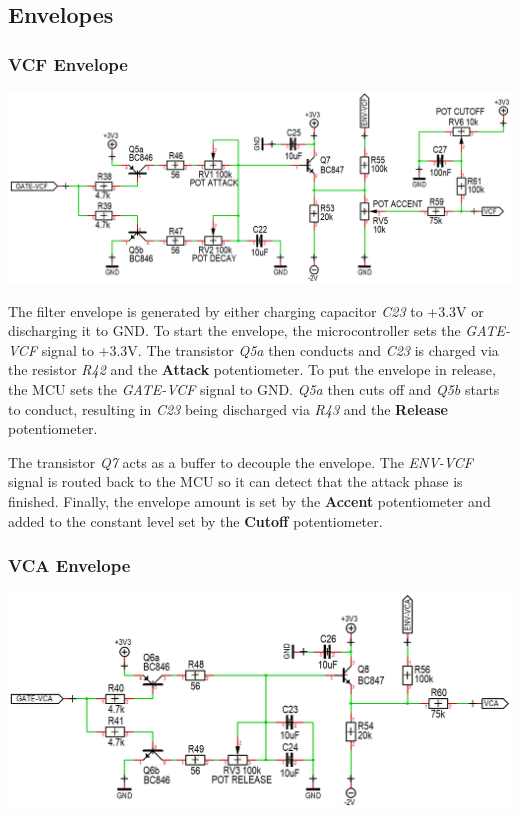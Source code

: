 \documentclass{scrartcl}
\begin{document}
\subsection{Envelopes}

\subsubsection{VCF Envelope}

\begin{center}
    \includegraphics[scale=0.35]{assets/schema-ar-vcf.png}
\end{center}

The filter envelope is generated by either charging capacitor \emph{C23} to +3.3V or discharging it to GND. To start the envelope, the microcontroller sets the \emph{GATE-VCF} signal to +3.3V. The transistor \emph{Q5a} then conducts and \emph{C23} is charged via the resistor \emph{R42} and the \textbf{Attack} potentiometer. To put the envelope in release, the MCU sets the \emph{GATE-VCF} signal to GND. \emph{Q5a} then cuts off and \emph{Q5b} starts to conduct, resulting in \emph{C23} being discharged via \emph{R43} and the \textbf{Release} potentiometer.

The transistor \emph{Q7} acts as a buffer to decouple the envelope. The \emph{ENV-VCF} signal is routed back to the MCU so it can detect that the attack phase is finished. Finally, the envelope amount is set by the \textbf{Accent} potentiometer and added to the constant level set by the \textbf{Cutoff} potentiometer.

\subsubsection{VCA Envelope}

\begin{center}
    \includegraphics[scale=0.35]{assets/schema-ar-vca.png}
\end{center}
\end{document}
